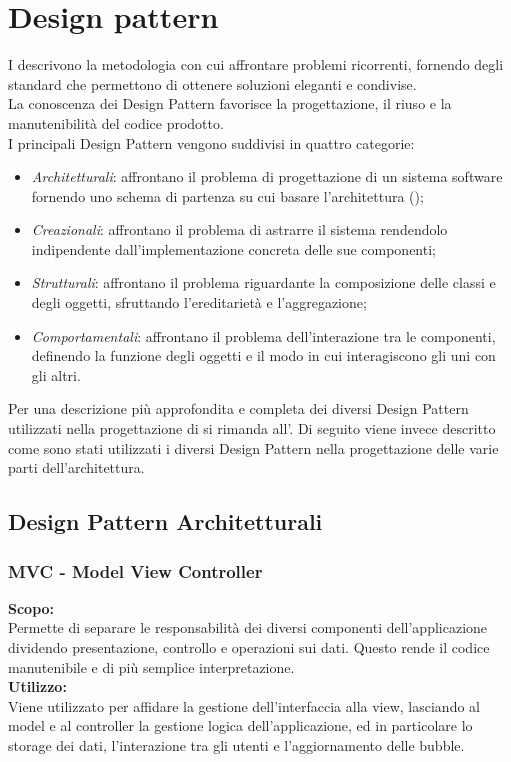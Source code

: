 \section{Design pattern}
I  descrivono la metodologia con cui affrontare problemi ricorrenti, fornendo degli standard che permettono di ottenere soluzioni eleganti e condivise.\\
La conoscenza dei Design Pattern favorisce la progettazione, il riuso e la manutenibilità del codice prodotto.\\
I principali Design Pattern vengono suddivisi in quattro categorie:
\begin{itemize}
	\item \textit{Architetturali}: affrontano il problema di progettazione di un sistema software fornendo uno schema di partenza su cui basare l'architettura ();
	\item \textit{Creazionali}: affrontano il problema di astrarre il sistema rendendolo indipendente dall'implementazione concreta delle sue componenti;
	\item \textit{Strutturali}: affrontano il problema riguardante la composizione delle classi e degli oggetti, sfruttando l'ereditarietà e l'aggregazione;
	\item \textit{Comportamentali}: affrontano il problema dell'interazione tra le componenti, definendo la funzione degli oggetti e il modo in cui interagiscono gli uni con gli altri.
\end{itemize}
Per una descrizione più approfondita e completa dei diversi Design Pattern utilizzati nella progettazione di \ProjectName{} si rimanda all'. Di seguito viene invece descritto come sono stati utilizzati i diversi Design Pattern nella progettazione delle varie parti dell'architettura.

\subsection{Design Pattern Architetturali}

\subsubsection{MVC - Model View Controller}
\textbf{Scopo:}\\ 
Permette di separare le responsabilità dei diversi componenti dell'applicazione dividendo presentazione, controllo e operazioni sui dati. Questo rende il codice manutenibile e di più semplice interpretazione.\\
\textbf{Utilizzo:}\\
Viene utilizzato per affidare la gestione dell'interfaccia alla view, lasciando al model e al controller la gestione logica dell'applicazione, ed in particolare lo storage dei dati, l'interazione tra gli utenti e l'aggiornamento delle bubble.

